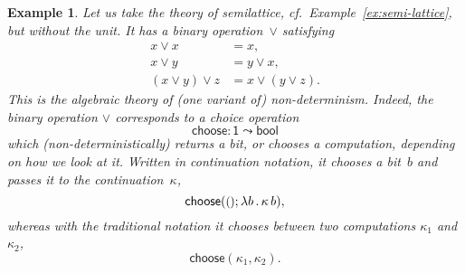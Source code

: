 \documentclass{amsart}
\newcommand{\lam}[1]{\lambda #1 \,.\,}
\newcommand{\opdecl}[3]{#1 : #2 \leadsto #3} %
\newcommand{\one}{\mathsf{1}} %
\newcommand{\unit}{{\text{\small$()$}}} %
\newcommand{\bool}{\mathsf{bool}} %
\newcommand{\kode}[1]{\mathsf{#1}}
\newcommand{\opcall}[3]{\kode{#1}(#2; #3)}
\newtheorem{example}[definition]{Example}
\begin{document}
\begin{example}
  \label{ex:non-determinism}
  Let us take the theory of semilattice, cf.\ Example~\ref{ex:semi-lattice}, but without the
  unit. It has a binary operation~$\vee$ satisfying
  \begin{align*}
    x \vee x &= x, \\
    x \vee y &= y \vee x, \\
    (x \vee y) \vee z &= x \vee (y \vee z).
  \end{align*}
  This is the algebraic theory of (one variant of) \emph{non-determinism}.
  Indeed, the binary operation $\vee$ corresponds to a choice operation
  \begin{equation*}
    \opdecl{\kode{choose}}{\one}{\bool}
  \end{equation*}
  which (non-deterministically) returns a bit, or chooses a computation, depending
  on how we look at it. Written in continuation notation, it chooses a bit~$b$
  and passes it to the continuation~$\kappa$,
  \begin{equation*}
    \opcall{choose}{\unit}{\lam{b}{\kappa \, b}},
  \end{equation*}
  whereas with the traditional notation it chooses between two computations
  $\kappa_1$ and $\kappa_2$,
  \begin{equation*}
    \kode{choose}(\kappa_1, \kappa_2).
  \end{equation*}
\end{example}
\end{document}
